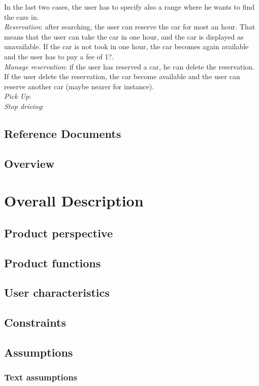 \documentclass[11pt,a4paper]{report}
\begin{document}
	In the last two cases, the user has to specify also a range where he wants to find the cars in.\\
\textit{Reservation}: after searching, the user can reserve the car for most an hour. That means that the user can take the car in one hour, and the car is displayed as unavailable. If the car is not took in one hour, the car becomes again available and the user has to pay a fee of 1?. \\
\textit{Manage reservation}: if the user has reserved a car, he can delete the reservation. If the user delete the reservation, the car become available and the user can reserve another car (maybe nearer for instance).\\
\textit{Pick Up}: \\
\textit{Stop driving}: \\

\section{Reference Documents}
\section{Overview}
\chapter{Overall Description}
\section{Product perspective}
\section{Product functions}
\section{User characteristics}
\section{Constraints}
\section{Assumptions}
\subsection{Text assumptions}
\end{document}
